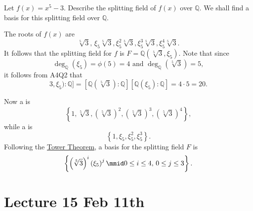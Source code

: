 \documentclass[notoc,notitlepage]{tufte-book}
\begin{document}
\begin{eg}
  Let $f(x) = x^5 - 3$. Describe the splitting field of $f(x)$ over $\mathbb{Q}$. We shall
  find a basis for this splitting field over $\mathbb{Q}$.

  The roots of $f(x)$ are
  \begin{equation*}
    \sqrt[5]{3}, \, \xi_5 \sqrt[5]{3}, \xi_5^2 \sqrt[5]{3}, \xi_5^3 \sqrt[5]{3}, \xi_5^4
    \sqrt[5]{3}.
  \end{equation*}
  It follows that the splitting field for $f$ is $F = \mathbb{Q}(\sqrt[5]{3}, \xi_5)$.
  Note that since
  \begin{equation*}
    \deg_{\mathbb{Q}}(\xi_5) = \phi(5) = 4 \text{ and } \deg_{\mathbb{Q}}(\sqrt[5]{3}) =
    5,
  \end{equation*}
  it follows from A4Q2 that
  \begin{equation*}
    [ \mathbb{Q}(\sqrt[5]{3}, \xi_5) : \mathbb{Q} ] = [ \mathbb{Q}(\sqrt[5]{3}) :
    \mathbb{Q} ][ \mathbb{Q}(\xi_5) : \mathbb{Q} ] = 4 \cdot 5 = 20.
  \end{equation*}

  Now a  is
  \begin{equation*}
    \left\{ 1, \sqrt[5]{3}, \left( \sqrt[5]{3} \right)^2, \left( \sqrt[5]{3} \right)^3,
    \left( \sqrt[5]{3} \right)^4 \right\},
  \end{equation*}
  while a  is
  \begin{equation*}
    \left\{ 1, \xi_5, \xi_5^2, \xi_5^3 \right\}.
  \end{equation*}
  Following the \hyperref[thm:tower_theorem]{Tower Theorem}, a basis for the splitting
  field $F$ is
  \begin{equation*}
    \left\{ \left( \sqrt[5]{3} \right)^i \left( \xi_5 \right)^j \mmid 0 \leq i \leq 4, \,
    0 \leq j \leq 3 \right\}.
  \end{equation*}
\end{eg}



\chapter{Lecture 15 Feb 11th}%
\label{chp:lecture_15_feb_11th}
\end{document}

